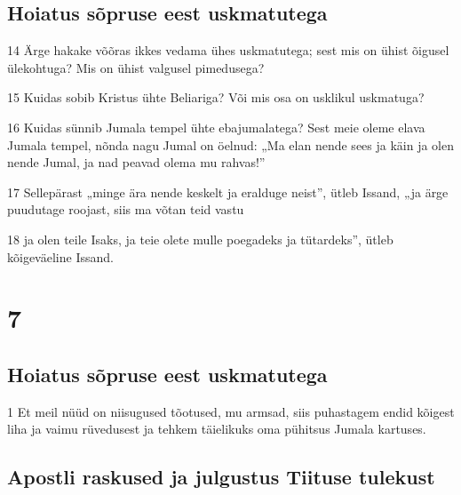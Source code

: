 \section*{Hoiatus sõpruse eest uskmatutega}

\par 14 Ärge hakake võõras ikkes vedama ühes uskmatutega; sest mis on ühist õigusel ülekohtuga? Mis on ühist valgusel pimedusega?
\par 15 Kuidas sobib Kristus ühte Beliariga? Või mis osa on usklikul uskmatuga?
\par 16 Kuidas sünnib Jumala tempel ühte ebajumalatega? Sest meie oleme elava Jumala tempel, nõnda nagu Jumal on öelnud: „Ma elan nende sees ja käin ja olen nende Jumal, ja nad peavad olema mu rahvas!”
\par 17 Sellepärast „minge ära nende keskelt ja eralduge neist”, ütleb Issand, „ja ärge puudutage roojast, siis ma võtan teid vastu
\par 18 ja olen teile Isaks, ja teie olete mulle poegadeks ja tütardeks”, ütleb kõigeväeline Issand.


\chapter{7}

\section*{Hoiatus sõpruse eest uskmatutega}

\par 1 Et meil nüüd on niisugused tõotused, mu armsad, siis puhastagem endid kõigest liha ja vaimu rüvedusest ja tehkem täielikuks oma pühitsus Jumala kartuses.

\section*{Apostli raskused ja julgustus Tiituse tulekust}

